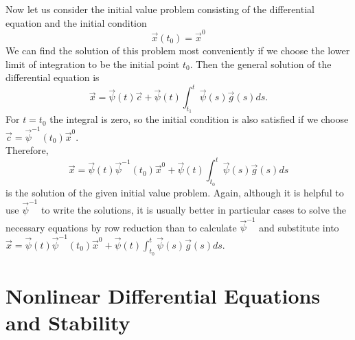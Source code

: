 \documentclass[10pt]{report}
\begin{document}
Now let us consider the initial value problem consisting of the differential equation and the initial condition
$$\vec{x}(t_0) = \vec{x}^0$$
We can find the solution of this problem most conveniently if we choose the lower limit of integration to be the initial point $t_0$. Then the general solution of the differential equation is
$$\vec{x} = \vec{\psi}(t)\vec{c} + \vec{\psi}(t)\int_{t_1}^t\vec{\psi}(s)\vec{g}(s)ds.$$
For $t=t_0$ the integral is zero, so the initial condition is also satisfied if we choose $\vec{c} = \vec{\psi}^{-1}(t_0)\vec{x}^0$.\\
Therefore,
$$\vec{x} = \vec{\psi}(t)\vec{\psi}^{-1}(t_0)\vec{x}^0 + \vec{\psi}(t)\int_{t_0}^t\vec{\psi}(s)\vec{g}(s)ds$$
is the solution of the given initial value problem. Again, although it is helpful to use $\vec{\psi}^{-1}$ to write the solutions, it is usually better in particular cases to solve the necessary equations by row reduction than to calculate $\vec{\psi}^{-1}$ and substitute into $\vec{x} = \vec{\psi}(t)\vec{\psi}^{-1}(t_0)\vec{x}^0 + \vec{\psi}(t)\int_{t_0}^t\vec{\psi}(s)\vec{g}(s)ds$.

\section{Nonlinear Differential Equations and Stability}
\end{document}
